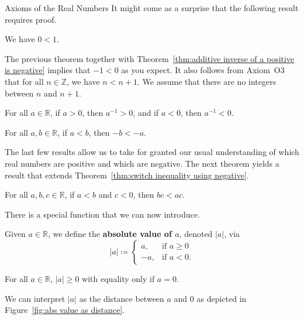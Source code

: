 \begin{section}{Axioms of the Real Numbers}
It might come as a surprise that the following result requires proof.

\begin{theorem}\label{thm:0<1}
We have $0<1$.
\end{theorem}

The previous theorem together with Theorem~\ref{thm:additive inverse of a positive is negative} implies that $-1<0$ as you expect. It also follows from Axiom~O3 that for all $n\in\mathbb{Z}$, we have $n<n+1$. We assume that there are no integers between $n$ and $n+1$.

\begin{theorem}
For all $a\in\mathbb{R}$, if $a>0$, then $a^{-1}>0$, and if $a<0$, then $a^{-1}<0$.
\end{theorem}

\begin{theorem}\label{thm:switch inequality using negative}
For all $a,b\in \mathbb{R}$, if $a<b$, then $-b<-a$. 
\end{theorem}

The last few results allow us to take for granted our usual understanding of which real numbers are positive and which are negative. The next theorem yields a result that extends Theorem~\ref{thm:switch inequality using negative}.

\begin{theorem}
For all $a,b,c\in \mathbb{R}$, if $a<b$ and $c<0$, then $bc<ac$. 
\end{theorem}

There is a special function that we can now introduce. 

\begin{definition}
Given $a\in\mathbb{R}$, we define the \textbf{absolute value of $a$}, denoted $|a|$, via
\[
\boxed{|a|\coloneqq \begin{cases}
a, & \text{if }a\geq 0\\
-a, & \text{if }a<0.
\end{cases}}
\]
\end{definition}

\begin{theorem}
For all $a\in\mathbb{R}$, $|a|\geq 0$ with equality only if $a=0$.
\end{theorem}

We can interpret $|a|$ as the distance between $a$ and 0 as depicted in Figure~\ref{fig:abs value as distance}. 


\end{section}
